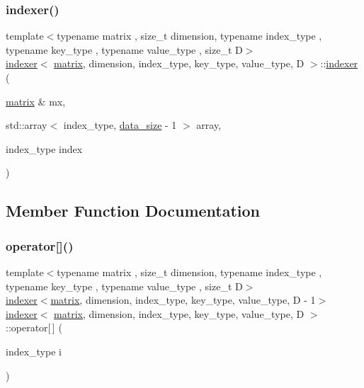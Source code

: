 \subsubsection{\texorpdfstring{indexer()}{indexer()}}
{\footnotesize\ttfamily template$<$typename matrix , size\+\_\+t dimension, typename index\+\_\+type , typename key\+\_\+type , typename value\+\_\+type , size\+\_\+t D$>$ \\
\hyperlink{structindexer}{indexer}$<$ \hyperlink{structmatrix}{matrix}, dimension, index\+\_\+type, key\+\_\+type, value\+\_\+type, D $>$\+::\hyperlink{structindexer}{indexer} (\begin{DoxyParamCaption}\item[{\hyperlink{structmatrix}{matrix} \&}]{mx,  }\item[{std\+::array$<$ index\+\_\+type, \hyperlink{structindexer_a895fa35da574edcb525dcb7705f771b2}{data\+\_\+size} -\/ 1 $>$}]{array,  }\item[{index\+\_\+type}]{index }\end{DoxyParamCaption})\hspace{0.3cm}{\ttfamily [inline]}}



\subsection{Member Function Documentation}
\mbox{\label{structindexer_a1d3df5b1ea8654fa272ecb3bb0e5d799}} 
\subsubsection{\texorpdfstring{operator[]()}{operator[]()}}
{\footnotesize\ttfamily template$<$typename matrix , size\+\_\+t dimension, typename index\+\_\+type , typename key\+\_\+type , typename value\+\_\+type , size\+\_\+t D$>$ \\
\hyperlink{structindexer}{indexer}$<$\hyperlink{structmatrix}{matrix}, dimension, index\+\_\+type, key\+\_\+type, value\+\_\+type, D -\/ 1$>$ \hyperlink{structindexer}{indexer}$<$ \hyperlink{structmatrix}{matrix}, dimension, index\+\_\+type, key\+\_\+type, value\+\_\+type, D $>$\+::operator\mbox{[}$\,$\mbox{]} (\begin{DoxyParamCaption}\item[{index\+\_\+type}]{i }\end{DoxyParamCaption})\hspace{0.3cm}{\ttfamily [inline]}}



